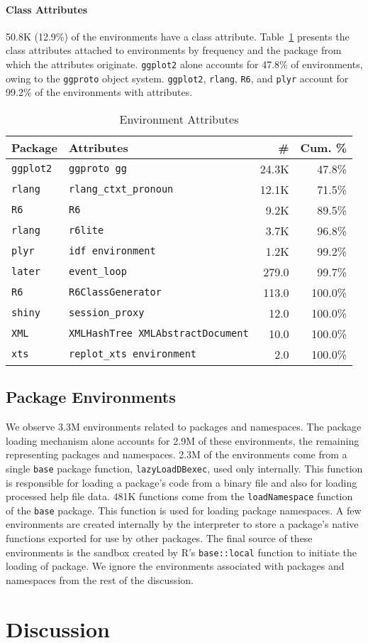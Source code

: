 \documentclass[10pt,review,sigplan,anonymous=true,authorversion=true,nonacm=true]{acmart}
\newcommand{\code}[1]{\lstinline |#1|\xspace}
\newcommand{\base}{\code{base}}
\newcommand{\lazyLoadDBexec}{\code{lazyLoadDBexec}}
\begin{document}
\paragraph{Class Attributes}
50.8K (12.9\%) of the environments have a class attribute.
Table~\ref{table:explicit_env_attr} presents the class attributes attached to
environments by frequency and the package from which the attributes originate.
\code{ggplot2} alone accounts for 47.8\% of environments, owing to the
\code{ggproto} object system. \code{ggplot2}, \code{rlang}, \code{R6}, and
\code{plyr} account for 99.2\% of the environments with attributes.
\begin{table}[!h]
  \vspace{-3mm}
  \small
  \caption{Environment Attributes} \label{table:explicit_env_attr}
  \centering
  \begin{tabular}{llrr}
    \toprule
    \textbf{Package}&\textbf{Attributes}&\textbf{\#}&\textbf{Cum. \%}\\
    \midrule
    \texttt{ggplot2}&\texttt{ggproto gg}&24.3K&47.8\%\\
    \texttt{rlang}&\texttt{rlang\_ctxt\_pronoun}&12.1K&71.5\%\\
    \texttt{R6}&\texttt{R6}&9.2K&89.5\%\\
    \texttt{rlang}&\texttt{r6lite}&3.7K&96.8\%\\
    \texttt{plyr}&\texttt{idf environment}&1.2K&99.2\%\\
    \texttt{later}&\texttt{event\_loop}&279.0&99.7\%\\
    \texttt{R6}&\texttt{R6ClassGenerator}&113.0&100.0\%\\
    \texttt{shiny}&\texttt{session\_proxy}&12.0&100.0\%\\
    \texttt{XML}&\texttt{XMLHashTree XMLAbstractDocument}&10.0&100.0\%\\
    \texttt{xts}&\texttt{replot\_xts environment}&2.0&100.0\%\\
    \bottomrule
  \end{tabular}
\end{table}

\subsection{Package Environments}
We observe 3.3M environments related to packages and namespaces. The package
loading mechanism alone accounts for 2.9M of these environments, the remaining
representing packages and namespaces. 2.3M of the environments come from a
single \base package function, \lazyLoadDBexec, used only internally. This
function is responsible for loading a package's code from a binary file and also
for loading processed help file data. 481K functions come from the
\code{loadNamespace} function of the \code{base} package. This function is used
for loading package namespaces. A few environments are created internally by the
interpreter to store a package's native functions exported for use by other
packages. The final source of these environments is the sandbox created by R's
\code{base::local} function to initiate the loading of package. We ignore the
environments associated with packages and namespaces from the rest of the
discussion.

\section{Discussion}


\end{document}
